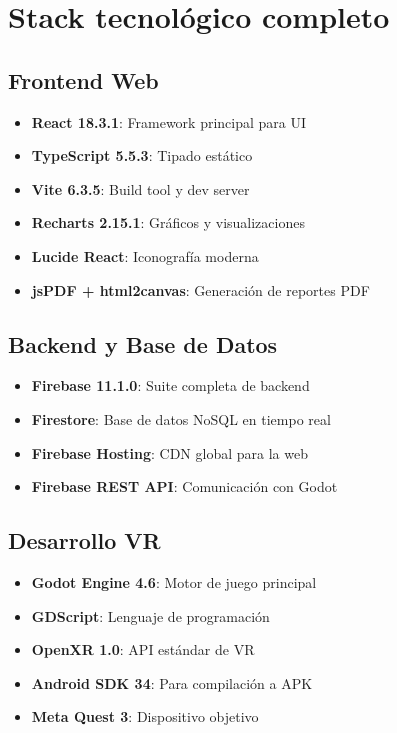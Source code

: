 \section{Stack tecnológico completo}

\subsection{Frontend Web}

\begin{itemize}
    \item \textbf{React 18.3.1}: Framework principal para UI
    \item \textbf{TypeScript 5.5.3}: Tipado estático
    \item \textbf{Vite 6.3.5}: Build tool y dev server
    \item \textbf{Recharts 2.15.1}: Gráficos y visualizaciones
    \item \textbf{Lucide React}: Iconografía moderna
    \item \textbf{jsPDF + html2canvas}: Generación de reportes PDF
\end{itemize}

\subsection{Backend y Base de Datos}

\begin{itemize}
    \item \textbf{Firebase 11.1.0}: Suite completa de backend
    \item \textbf{Firestore}: Base de datos NoSQL en tiempo real
    \item \textbf{Firebase Hosting}: CDN global para la web
    \item \textbf{Firebase REST API}: Comunicación con Godot
\end{itemize}

\subsection{Desarrollo VR}

\begin{itemize}
    \item \textbf{Godot Engine 4.6}: Motor de juego principal
    \item \textbf{GDScript}: Lenguaje de programación
    \item \textbf{OpenXR 1.0}: API estándar de VR
    \item \textbf{Android SDK 34}: Para compilación a APK
    \item \textbf{Meta Quest 3}: Dispositivo objetivo
\end{itemize}

